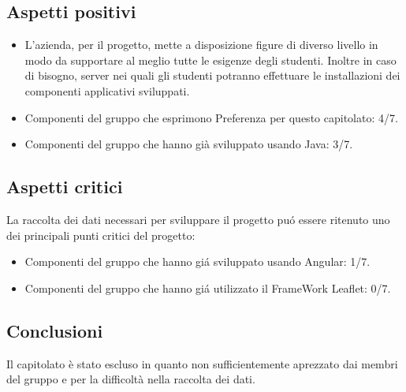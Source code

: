 \subsection{Aspetti positivi}
\begin{itemize}
\item L'azienda, per il progetto, mette a disposizione figure di diverso livello in modo da supportare al meglio tutte le esigenze degli studenti. Inoltre in caso di bisogno, server nei quali gli studenti potranno effettuare le installazioni dei componenti applicativi sviluppati.

\item Componenti del gruppo che esprimono Preferenza per questo capitolato: 4/7.
\item Componenti del gruppo che hanno già sviluppato usando Java: 3/7.
\end{itemize}

\subsection{Aspetti critici}
La raccolta dei dati necessari per sviluppare il progetto pu\'o essere ritenuto uno dei principali punti critici del progetto:
\begin{itemize}
\item Componenti del gruppo che hanno gi\'a sviluppato usando Angular: 1/7.
\item Componenti del gruppo che hanno gi\'a utilizzato il FrameWork Leaflet: 0/7.
\end{itemize}

\subsection{Conclusioni}
Il capitolato è stato escluso in quanto non sufficientemente aprezzato dai membri del gruppo e per la difficoltà nella raccolta dei dati.